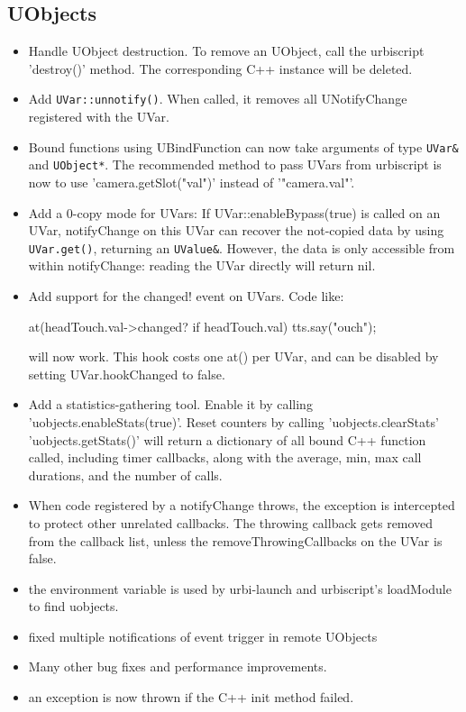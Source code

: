 \subsection{UObjects}
\begin{itemize}
\item Handle UObject destruction. To remove an UObject, call the urbiscript
  'destroy()' method. The corresponding C++ instance will be deleted.

\item Add \lstinline|UVar::unnotify()|. When called, it removes all
  UNotifyChange registered with the UVar.

\item Bound functions using UBindFunction can now take arguments of
  type \lstinline|UVar&| and \lstinline|UObject*|. The recommended
  method to pass UVars from urbiscript is now to use
  'camera.getSlot("val")' instead of '"camera.val"'.

\item Add a 0-copy mode for UVars: If UVar::enableBypass(true) is
  called on an UVar, notifyChange on this UVar can recover the
  not-copied data by using \lstinline|UVar.get()|, returning an
  \lstinline|UValue&|. However, the data is only accessible from
  within notifyChange: reading the UVar directly will return nil.

\item Add support for the changed! event on UVars. Code like:

\begin{urbiunchecked}
at(headTouch.val->changed? if headTouch.val) tts.say("ouch");
\end{urbiunchecked}
  \noindent
  will now work. This hook costs one at() per UVar, and can be disabled by
  setting UVar.hookChanged to false.

\item Add a statistics-gathering tool. Enable it by calling
  'uobjects.enableStats(true)'. Reset counters by calling
  'uobjects.clearStats' 'uobjects.getStats()' will return a dictionary
  of all bound C++ function called, including timer callbacks, along
  with the average, min, max call durations, and the number of calls.

\item When code registered by a notifyChange throws, the exception is
  intercepted to protect other unrelated callbacks. The throwing
  callback gets removed from the callback list, unless the
  removeThrowingCallbacks on the UVar is false.

\item the environment variable  is used by
  urbi-launch and urbiscript's loadModule to find uobjects.

\item fixed multiple notifications of event trigger in remote UObjects

\item Many other bug fixes and performance improvements.

\item an exception is now thrown if the C++ init method failed.
\end{itemize}


